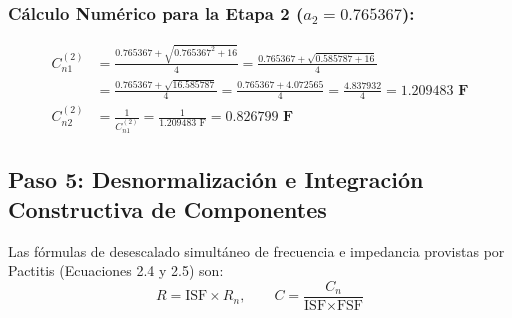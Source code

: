 \documentclass[a4paper,11pt]{article}
\begin{document}
\subsubsection{Cálculo Numérico para la Etapa 2 \texorpdfstring{($a_2 = 0.765367$)}{(a2 = 0.765367)}:}
\begin{align}
C_{n1}^{(2)} &= \frac{0.765367 + \sqrt{0.765367^2 + 16}}{4} = \frac{0.765367 + \sqrt{0.585787 + 16}}{4} \nonumber \\
             &= \frac{0.765367 + \sqrt{16.585787}}{4} = \frac{0.765367 + 4.072565}{4} = \frac{4.837932}{4} = \mathbf{1.209483\text{ F}} \\
C_{n2}^{(2)} &= \frac{1}{C_{n1}^{(2)}} = \frac{1}{1.209483\text{ F}} = \mathbf{0.826799\text{ F}}
\end{align}

\subsection{Paso 5: Desnormalización e Integración Constructiva de Componentes}
Las fórmulas de desescalado simultáneo de frecuencia e impedancia provistas por Pactitis (Ecuaciones 2.4 y 2.5) son:
\begin{equation}
R = \text{ISF} \times R_n, \qquad C = \frac{C_n}{\text{ISF} \times \text{FSF}}
\end{equation}
\end{document}
